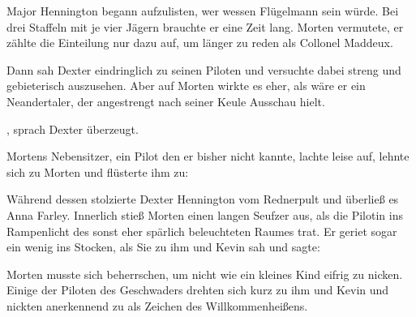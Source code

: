 
\par

Major Hennington begann aufzulisten, wer wessen Flügelmann sein würde. Bei drei Staffeln mit je vier Jägern brauchte er eine Zeit lang. Morten vermutete, er zählte die Einteilung nur dazu auf, um länger zu reden als Collonel Maddeux.

\par

Dann sah Dexter eindringlich zu seinen Piloten und versuchte dabei streng und gebieterisch auszusehen. Aber auf Morten wirkte es eher, als wäre er ein Neandertaler, der angestrengt nach seiner Keule Ausschau hielt.

\par

, sprach Dexter überzeugt. 

\par

Mortens Nebensitzer, ein Pilot den er bisher nicht kannte, lachte leise auf, lehnte sich zu Morten und flüsterte ihm zu: 

\par

Während dessen stolzierte Dexter Hennington vom Rednerpult und überließ es Anna Farley. Innerlich stieß Morten einen langen Seufzer aus, als die Pilotin ins Rampenlicht des sonst eher spärlich beleuchteten Raumes trat. Er geriet sogar ein wenig ins Stocken, als Sie zu ihm und Kevin sah und sagte: 

\par

Morten musste sich beherrschen, um nicht wie ein kleines Kind eifrig zu nicken. Einige der Piloten des Geschwaders drehten sich kurz zu ihm und Kevin und nickten anerkennend zu als Zeichen des Willkommenheißens.

